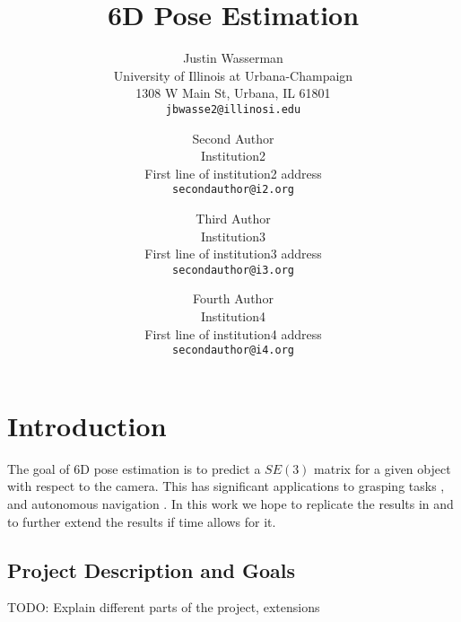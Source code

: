 \documentclass[10pt,twocolumn,letterpaper]{article}
\begin{document}
\title{6D Pose Estimation}

\author{Justin Wasserman\\
University of Illinois at Urbana-Champaign\\
1308 W Main St, Urbana, IL 61801\\
{\tt\small jbwasse2@illinosi.edu}
\and
Second Author\\
Institution2\\
First line of institution2 address\\
{\tt\small secondauthor@i2.org}
\and
Third Author\\
Institution3\\
First line of institution3 address\\
{\tt\small secondauthor@i3.org}
\and
Fourth Author\\
Institution4\\
First line of institution4 address\\
{\tt\small secondauthor@i4.org}
}


\maketitle

\begin{abstract}
    \lipsum[1]
\end{abstract}

\section{Introduction}
The goal of 6D pose estimation is to predict a $SE(3)$ matrix for a given object with respect to the camera. This has significant applications to grasping tasks \cite{tremblayDeepObjectPose2018} \cite{xiangPoseCNNConvolutionalNeural2018}, and autonomous navigation \cite{wangDenseFusion6DObject2019}. In this work we hope to replicate the results in \cite{wangDenseFusion6DObject2019} and to further extend the results if time allows for it.


\subsection{Project Description and Goals}
TODO: Explain different parts of the project, extensions
\end{document}

